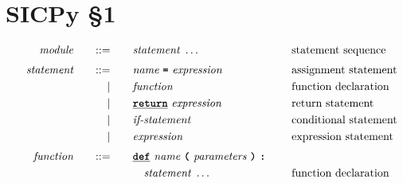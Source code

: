 \section*{SICPy \S1}

\begin{alignat*}{9}
&& \textit{module}    &&\quad ::= &\quad && \textit{statement} \ \ldots
                                                           && \textrm{{statement sequence}} \\[1mm]
&& \textit{statement}    &&\quad ::= &\quad && \textit{name} \ \textbf{\texttt{=}}\  \textit{expression} \
                                                           && \textrm{assignment statement} \\
&&                       && |   &\quad && \textit{function} \quad
                                                           && \textrm{function declaration}\\
&&                       && |   &\quad && \textbf{\texttt{\underline{return}}}\  \textit{expression} \
                                                           && \textrm{return statement}\\
&&                       && |   &\quad && \textit{if-statement} \quad
                                                           && \textrm{conditional statement}\\
&&                       && |   &\quad &&  \textit{expression} \ 
                                                           && \textrm{expression statement} \\[1mm]
&& \textit{function} && ::=&\quad && \textbf{\texttt{\underline{def}}}\  \textit{name} \ 
                                   \textbf{\texttt{(}}\  \textit{parameters} \ \textbf{\texttt{)}} \
                                   \textbf{\texttt{:}} \ \quad
                                                           && \\         
&&                       &&     &\quad && \quad \textit{statement} \ \ldots \quad
                                                           && \textrm{function declaration}\\                                                           

\end{alignat*}
